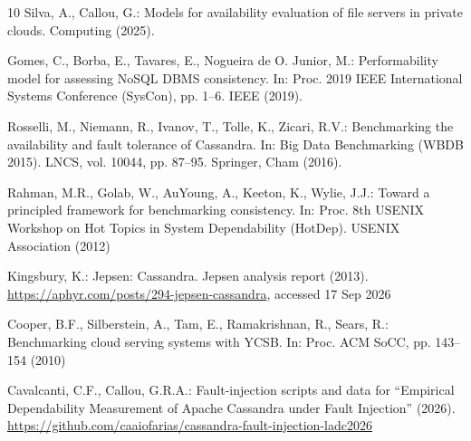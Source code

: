 \documentclass[runningheads]{llncs}
\begin{document}
\begin{thebibliography}{10}
Silva, A., Callou, G.: Models for availability evaluation of file servers in
private clouds. Computing (2025).

Gomes, C., Borba, E., Tavares, E., Nogueira de O. Junior, M.: Performability
model for assessing NoSQL DBMS consistency. In: Proc. 2019 IEEE International
Systems Conference (SysCon), pp. 1--6. IEEE (2019).

Rosselli, M., Niemann, R., Ivanov, T., Tolle, K., Zicari, R.V.: Benchmarking the
availability and fault tolerance of Cassandra. In: Big Data Benchmarking (WBDB
2015). LNCS, vol. 10044, pp. 87--95. Springer, Cham (2016).

Rahman, M.R., Golab, W., AuYoung, A., Keeton, K., Wylie, J.J.: Toward a
principled framework for benchmarking consistency. In: Proc. 8th USENIX Workshop
on Hot Topics in System Dependability (HotDep). USENIX Association (2012)

Kingsbury, K.: Jepsen: Cassandra. Jepsen analysis report (2013).
\url{https://aphyr.com/posts/294-jepsen-cassandra}, accessed 17 Sep 2026

Cooper, B.F., Silberstein, A., Tam, E., Ramakrishnan, R., Sears, R.:
Benchmarking cloud serving systems with YCSB. In: Proc. ACM SoCC, pp. 143--154
(2010)

Cavalcanti, C.F., Callou, G.R.A.: Fault-injection scripts and data for
``Empirical Dependability Measurement of Apache Cassandra under Fault
Injection'' (2026).
\url{https://github.com/caaiofarias/cassandra-fault-injection-ladc2026}

\end{thebibliography}
\end{document}
